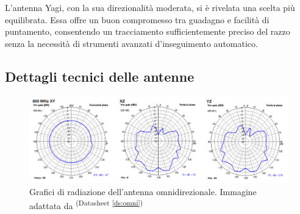 \documentclass[12pt,a4paper,twoside]{book}
\newcommand{\dsref}[1]{\textsuperscript{(Datasheet \ref{#1})}}
\begin{document}
L'antenna Yagi, con la sua direzionalità moderata, si è rivelata una scelta più
equilibrata. Essa offre un buon compromesso tra guadagno e facilità di puntamento,
consentendo un tracciamento sufficientemente preciso del razzo senza la necessità
di strumenti avanzati d'inseguimento automatico.

\subsection*{Dettagli tecnici delle antenne}

\begin{table}[H]
    \centering
    \caption{Specifiche tecniche dell'antenna omnidirezionale e dell'antenna Yagi.}
    \label{tab:antenne_confronto}
\end{table}

\begin{figure}[H]
    \centering
    \includegraphics[width=\textwidth]{img/omnidirezionale-rad-plot.png}
    \caption[Grafici di radiazione antenna omnidirezionale]%
    {Grafici di radiazione dell'antenna omnidirezionale. \tiny{Immagine adattata da \dsref{ds:omni}}}%
    \label{fig:omni-rad-plot}
\end{figure}
\end{document}
